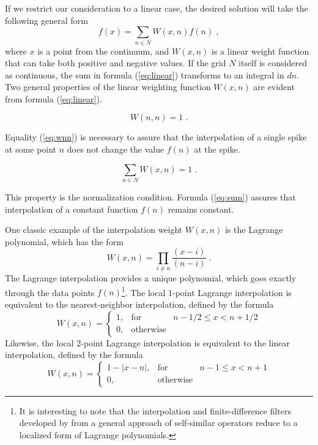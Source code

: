 
If we restrict our consideration to a linear case, the desired
solution will take the following general form
\begin{equation}\label{eq:linear}
  f (x) = \sum_{n \in N} W (x, n) f (n)\;,
\end{equation}
where $x$ is a point from the continuum, and $W (x, n)$ is a linear
weight function that can take both positive and negative values. If
the grid $N$ itself is considered as continuous, the sum in formula
(\ref{eq:linear}) transforms to an integral in $dn$. Two general
properties of the linear weighting function $W (x, n)$ are evident
from formula (\ref{eq:linear}).
\begin{property} 
\begin{equation}\label{eq:wnn}
  W (n, n) = 1\;.
\end{equation}
\end{property}
Equality (\ref{eq:wnn}) is necessary to assure that the interpolation
of a single spike at some point $n$ does not change the value $f (n)$
at the spike. 
\begin{property}
\begin{equation}\label{eq:sum}
  \sum_{n \in N} W (x, n) = 1\;.
\end{equation}
\end{property}
This property is the normalization condition. Formula (\ref{eq:sum})
assures that interpolation of a constant function $f(n)$ remains
constant.

One classic example of the interpolation weight $W (x, n)$ is the
Lagrange polynomial, which has the form
\begin{equation}\label{eq:lagrange}
  W (x, n) = \prod_{i \neq n} \frac{(x-i)}{(n-i)}\;.
\end{equation}
The Lagrange interpolation provides a unique polynomial, which goes
exactly through the data points $f (n)$\footnote{It is interesting to
note that the interpolation and finite-difference filters developed
by \cite{Karrenbach.sepphd.83} from a general approach of
self-similar operators reduce to a localized form of Lagrange
polynomials.}. The local 1-point Lagrange interpolation is equivalent
to the nearest-neighbor interpolation, defined by the formula
\begin{equation}\label{eq:bin}
  W (x, n) = \left\{\begin{array}{lcr}
1, & \mbox{for} & n - 1/2 \leq x < n + 1/2 \\
0, & \mbox{otherwise} &
\end{array}\right.
\end{equation}
Likewise, the local 2-point Lagrange interpolation is equivalent
to the linear interpolation, defined by the formula
\begin{equation}\label{eq:lin}
  W (x, n) = \left\{\begin{array}{lcr}
1 - |x-n|, & \mbox{for} & n - 1 \leq x < n + 1 \\
0, & \mbox{otherwise} &
\end{array}\right.
\end{equation}

